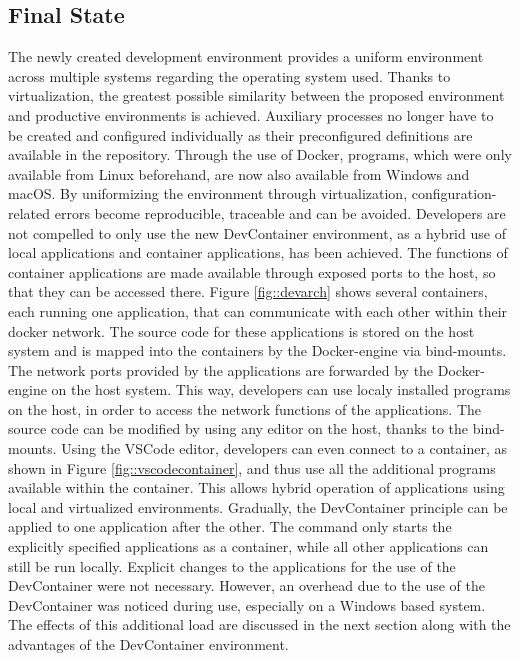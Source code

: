         \subsection{Final State}\label{sec::final}
        
        The newly created development environment provides a uniform environment across multiple systems regarding the operating system used. Thanks to virtualization, the greatest possible similarity between the proposed environment and productive environments is achieved. Auxiliary processes no longer have to be created and configured individually as their preconfigured definitions are available in the repository. Through the use of Docker, programs, which were only available from Linux beforehand, are now also available from Windows and macOS. By uniformizing the environment through virtualization, configuration-related errors become reproducible, traceable and can be avoided.\newline
        Developers are not compelled to only use the new DevContainer environment, as a hybrid use of local applications and container applications, has been achieved. The functions of container applications are made available through exposed ports to the host, so that they can be accessed there. Figure \ref{fig::devarch} shows several containers, each running one application, that can communicate with each other within their docker network. The source code for these applications is stored on the host system and is mapped into the containers by the Docker-engine via bind-mounts. The network ports provided by the applications are forwarded by the Docker-engine on the host system. This way, developers can use localy installed programs on the host, in order to access the network functions of the applications. The source code can be modified by using any editor on the host, thanks to the bind-mounts. Using the \ac{VSCode} editor, developers can even connect to a container, as shown in Figure \ref{fig::vscodecontainer}, and thus use all the additional programs available within the container.\newline
        This allows hybrid operation of applications using local and virtualized environments. Gradually, the DevContainer principle can be applied to one application after the other. The command  only starts the explicitly specified applications as a container, while all other applications can still be run locally. Explicit changes to the applications for the use of the DevContainer were not necessary.\newline
        However, an overhead due to the use of the DevContainer was noticed during use, especially on a Windows based system. The effects of this additional load are discussed in the next section along with the advantages of the DevContainer environment.

